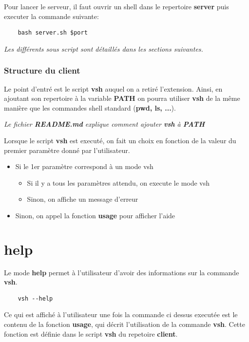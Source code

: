 \documentclass[titlepage]{article}
\begin{document}
	Pour lancer le serveur, il faut ouvrir un shell dans le repertoire \textbf{server} puis executer la commande suivante:

	\begin{lstlisting}
	bash server.sh $port
	\end{lstlisting}

	\textit{Les différents sous script sont détaillés dans les sections suivantes.}

	\subsubsection{Structure du client}

	Le point d'entré est le script \textbf{vsh} auquel on a retiré l'extension. Ainsi, en ajoutant son repertoire à la variable \textbf{PATH} on pourra utiliser \textbf{vsh} de la même manière que les commandes shell standard (\textbf{pwd, ls, ...}). \par
	\textit{Le fichier \textbf{README.md} explique comment ajouter \textbf{vsh} à \textbf{PATH}}

	Lorsque le script \textbf{vsh} est executé, on fait un choix en fonction de la valeur du premier paramètre donné par l'utilisateur.

	\begin{itemize}
		\item Si le 1er paramètre correspond à un mode vsh
		\begin{itemize}
			\item Si il y a tous les paramètres attendu, on execute le mode vsh
			\item Sinon, on affiche un message d'erreur
		\end{itemize}
		\item Sinon, on appel la fonction \textbf{usage} pour afficher l'aide
	\end{itemize}

	\section{help}

	Le mode \textbf{help} permet à l'utilisateur d'avoir des informations sur la commande \textbf{vsh}. 

	\begin{lstlisting}
	vsh --help
	\end{lstlisting}

	Ce qui est affiché à l'utilisateur une fois la commande ci dessus executée est le contenu de la fonction \textbf{usage}, qui décrit l'utilisation de la commande \textbf{vsh}. Cette fonction est définie dans le script \textbf{vsh} du repetoire \textbf{client}.
\end{document}
